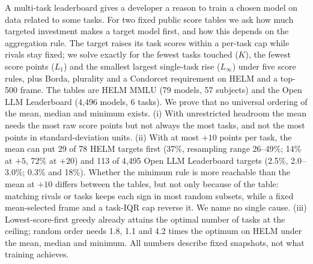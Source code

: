 A multi-task leaderboard gives a developer a reason to train a chosen model on data related to some tasks. For two fixed public score tables we ask how much targeted investment makes a target model first, and how this depends on the aggregation rule. The target raises its task scores within a per-task cap while rivals stay fixed; we solve exactly for the fewest tasks touched ($K$), the fewest score points ($L_1$) and the smallest largest single-task rise ($L_\infty$) under five score rules, plus Borda, plurality and a Condorcet requirement on HELM and a top-500 frame. The tables are HELM MMLU (79 models, 57 subjects) and the Open LLM Leaderboard (4{,}496 models, 6 tasks). We prove that no universal ordering of the mean, median and minimum exists. (i) With unrestricted headroom the mean needs the most raw score points but not always the most tasks, and not the most points in standard-deviation units. (ii) With at most $+10$ points per task, the mean can put 29 of 78 HELM targets first (37\%, resampling range 26--49\%; 14\% at $+5$, 72\% at $+20$) and 113 of 4{,}495 Open LLM Leaderboard targets (2.5\%, 2.0--3.0\%; 0.3\% and 18\%). Whether the minimum rule is more reachable than the mean at $+10$ differs between the tables, but not only because of the table: matching rivals or tasks keeps each sign in most random subsets, while a fixed mean-selected frame and a task-IQR cap reverse it. We name no single cause. (iii) Lowest-score-first greedy already attains the optimal number of tasks at the ceiling; random order needs 1.8, 1.1 and 4.2 times the optimum on HELM under the mean, median and minimum. All numbers describe fixed snapshots, not what training achieves.
